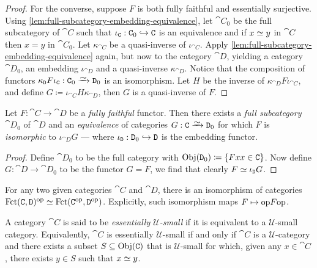 \begin{proof}
For the converse, suppose \(F\) is both fully faithful and essentially
surjective. Using \cref{lem:full-subcategory-embedding-equivalence}, let
\(\cat C_0\) be the full subcategory of \(\cat C\) such that
\(\iota_{\texttt C}: \texttt C_0 \hookrightarrow \texttt C\) is an equivalence and if \(x \simeq y\)
in \(\cat C\) then \(x = y\) in \(\cat C_0\). Let \(\kappa_{\cat C}\) be a
quasi-inverse of \(\iota_{\cat C}\). Apply
\cref{lem:full-subcategory-embedding-equivalence} again, but now to the category
\(\cat D\), yielding a category \(\cat D_0\), an embedding \(\iota_{\cat D}\)
and a quasi-inverse \(\kappa_{\cat D}\). Notice that the composition of functors
\(\kappa_{\cat D} F \iota_{\cat C}: \cat C_0 \isoto \cat D_0\) is an
isomorphism. Let \(H\) be the inverse of \(\kappa_{\cat D} F \iota_{\cat C}\),
and define \(G \coloneq \iota_{\cat C} H \kappa_{\cat D}\), then \(G\) is a
quasi-inverse of \(F\).
\end{proof}

\begin{corollary}
\label{cor:fully-faithful-induces-equivalence-to-full-subcategory}
Let \(F: \cat C \to \cat D\) be a \emph{fully faithful} functor. Then there
exists a \emph{full subcategory} \(\cat D_0\) of \(\cat D\) and an
\emph{equivalence} of categories \(G: \cat C \isoto \cat D_0\) for which \(F\)
is \emph{isomorphic} to \(\iota_{\cat D} G\) --- where
\(\iota_{\texttt D}: \texttt D_0 \hookrightarrow \texttt D\) is the embedding functor.
\end{corollary}

\begin{proof}
Define \(\cat D_0\) to be the full category with
\(\operatorname{Obj}(\texttt D_0) \coloneq \{F x \relax x \in \texttt C\}\). Now define
\(G: \cat D \to \cat D_0\) to be the functor \(G = F\), we find that clearly
\(F \simeq \iota_{\texttt D} G\).
\end{proof}

\begin{example}
\label{exp:equivalence-category-functor-opposite}
For any two given categories \(\cat C\) and \(\cat D\), there is an isomorphism
of categories \(\operatorname{Fct}(\texttt C, \texttt D)^{\mathrm{op}} \simeq \operatorname{Fct}(\texttt C^{\mathrm{op}}, \texttt
D^{\mathrm{op}})\). Explicitly, such isomorphism maps \(F \mapsto \mathrm{op} F \mathrm{op}\).
\end{example}

\begin{definition}
\label{def:essentially-U-small}
A category \(\cat C\) is said to be \emph{essentially \(\mathcal{U}\)-small} if
it is equivalent to a \(\mathcal{U}\)-small category. Equivalently, \(\cat C\)
is essentially \(\mathcal{U}\)-small if and only if \(\cat C\) is a
\(\mathcal{U}\)-category and there exists a subset \(S \subseteq \operatorname{Obj}(\texttt C)\)
that is \(\mathcal{U}\)-small for which, given any \(x \in \cat C\), there
exists \(y \in S\) such that \(x \simeq y\).
\end{definition}

